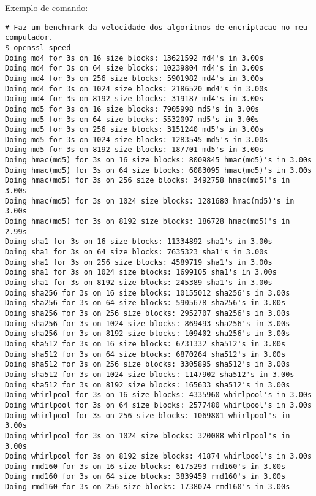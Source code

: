 \documentclass[a4paper,11pt]{article}
\theoremstyle{mytheor}
\begin{document}
Exemplo de comando:
\begin{lstlisting}
# Faz um benchmark da velocidade dos algoritmos de encriptacao no meu computador.
$ openssl speed
Doing md4 for 3s on 16 size blocks: 13621592 md4's in 3.00s
Doing md4 for 3s on 64 size blocks: 10239804 md4's in 3.00s
Doing md4 for 3s on 256 size blocks: 5901982 md4's in 3.00s
Doing md4 for 3s on 1024 size blocks: 2186520 md4's in 3.00s
Doing md4 for 3s on 8192 size blocks: 319187 md4's in 3.00s
Doing md5 for 3s on 16 size blocks: 7905998 md5's in 3.00s
Doing md5 for 3s on 64 size blocks: 5532097 md5's in 3.00s
Doing md5 for 3s on 256 size blocks: 3151240 md5's in 3.00s
Doing md5 for 3s on 1024 size blocks: 1283545 md5's in 3.00s
Doing md5 for 3s on 8192 size blocks: 187701 md5's in 3.00s
Doing hmac(md5) for 3s on 16 size blocks: 8009845 hmac(md5)'s in 3.00s
Doing hmac(md5) for 3s on 64 size blocks: 6083095 hmac(md5)'s in 3.00s
Doing hmac(md5) for 3s on 256 size blocks: 3492758 hmac(md5)'s in 3.00s
Doing hmac(md5) for 3s on 1024 size blocks: 1281680 hmac(md5)'s in 3.00s
Doing hmac(md5) for 3s on 8192 size blocks: 186728 hmac(md5)'s in 2.99s
Doing sha1 for 3s on 16 size blocks: 11334892 sha1's in 3.00s
Doing sha1 for 3s on 64 size blocks: 7635323 sha1's in 3.00s
Doing sha1 for 3s on 256 size blocks: 4589719 sha1's in 3.00s
Doing sha1 for 3s on 1024 size blocks: 1699105 sha1's in 3.00s
Doing sha1 for 3s on 8192 size blocks: 245389 sha1's in 3.00s
Doing sha256 for 3s on 16 size blocks: 10155012 sha256's in 3.00s
Doing sha256 for 3s on 64 size blocks: 5905678 sha256's in 3.00s
Doing sha256 for 3s on 256 size blocks: 2952707 sha256's in 3.00s
Doing sha256 for 3s on 1024 size blocks: 869493 sha256's in 3.00s
Doing sha256 for 3s on 8192 size blocks: 109402 sha256's in 3.00s
Doing sha512 for 3s on 16 size blocks: 6731332 sha512's in 3.00s
Doing sha512 for 3s on 64 size blocks: 6870264 sha512's in 3.00s
Doing sha512 for 3s on 256 size blocks: 3305895 sha512's in 3.00s
Doing sha512 for 3s on 1024 size blocks: 1147902 sha512's in 3.00s
Doing sha512 for 3s on 8192 size blocks: 165633 sha512's in 3.00s
Doing whirlpool for 3s on 16 size blocks: 4335960 whirlpool's in 3.00s
Doing whirlpool for 3s on 64 size blocks: 2577480 whirlpool's in 3.00s
Doing whirlpool for 3s on 256 size blocks: 1069801 whirlpool's in 3.00s
Doing whirlpool for 3s on 1024 size blocks: 320088 whirlpool's in 3.00s
Doing whirlpool for 3s on 8192 size blocks: 41874 whirlpool's in 3.00s
Doing rmd160 for 3s on 16 size blocks: 6175293 rmd160's in 3.00s
Doing rmd160 for 3s on 64 size blocks: 3839459 rmd160's in 3.00s
Doing rmd160 for 3s on 256 size blocks: 1738074 rmd160's in 3.00s

\end{lstlisting}
\end{document}
